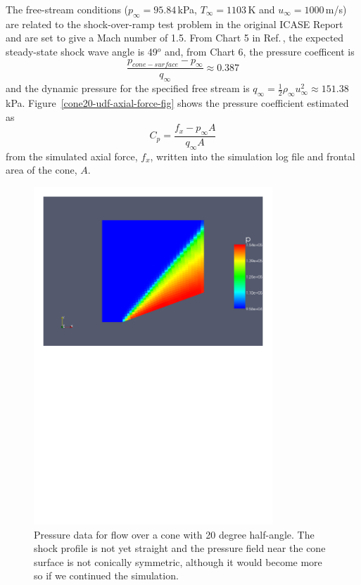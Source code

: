 \medskip
The free-stream conditions ($p_{\infty} = 95.84$\,kPa, $T_{\infty} = 1103$\,K
and $u_{\infty} = 1000$\,m/s) are related to the shock-over-ramp test problem
in the original ICASE Report\,\cite{jacobs_91d} and are set to give a 
Mach number of 1.5.
From Chart 5 in Ref.\,\cite{ames_53}, the expected steady-state shock wave
angle is 49$^o$ and, from Chart 6, the pressure coefficent is
$$
\frac{p_{cone-surface} - p_{\infty}}{q_{\infty}} \approx 0.387
$$
and the dynamic pressure for the specified free stream is
$q_{\infty} = \frac{1}{2} \rho_{\infty} u_{\infty}^2 \approx 151.38$\,kPa.
Figure~\ref{cone20-udf-axial-force-fig} shows the pressure coefficient 
estimated as
$$
C_p = \frac{f_x - p_{\infty} A}{q_{\infty} A}
$$
from the simulated axial force, $f_x$, written into the simulation log file
and frontal area of the cone, $A$.

\begin{figure}[htbp]
\begin{center}
\includegraphics[width=0.8\textwidth, viewport=24 447 571 819]{../2D/cone20-udf/cone20_p.pdf}
\end{center}
\caption{Pressure data for flow over a cone with 20 degree half-angle.
         The shock profile is not yet straight and the pressure field
         near the cone surface is not conically symmetric, although it
	 would become more so if we continued the simulation.}
\label{cone20-udf-pressure-fig}
\end{figure}

